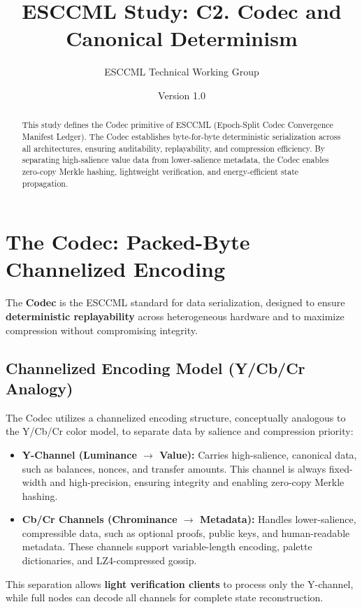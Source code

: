 \documentclass[11pt, a4paper]{article}
\title{\textbf{ESCCML Study: C2. Codec and Canonical Determinism}}
\author{ESCCML Technical Working Group}
\date{Version 1.0}
\begin{document}
\maketitle

\begin{abstract}
This study defines the Codec primitive of ESCCML (Epoch-Split Codec Convergence Manifest Ledger).
The Codec establishes byte-for-byte deterministic serialization across all architectures, ensuring
auditability, replayability, and compression efficiency. By separating high-salience value data from
lower-salience metadata, the Codec enables zero-copy Merkle hashing, lightweight verification, and
energy-efficient state propagation.
\end{abstract}

\section{The Codec: Packed-Byte Channelized Encoding}
The \textbf{Codec} is the ESCCML standard for data serialization, designed to ensure
\textbf{deterministic replayability} across heterogeneous hardware and to maximize compression
without compromising integrity.

\subsection{Channelized Encoding Model (Y/Cb/Cr Analogy)}
The Codec utilizes a channelized encoding structure, conceptually analogous to the Y/Cb/Cr color
model, to separate data by salience and compression priority:
\begin{itemize}
    \item \textbf{Y-Channel (Luminance $\rightarrow$ Value):} Carries high-salience, canonical data,
    such as balances, nonces, and transfer amounts. This channel is always fixed-width and
    high-precision, ensuring integrity and enabling zero-copy Merkle hashing.
    \item \textbf{Cb/Cr Channels (Chrominance $\rightarrow$ Metadata):} Handles lower-salience,
    compressible data, such as optional proofs, public keys, and human-readable metadata.
    These channels support variable-length encoding, palette dictionaries, and LZ4-compressed gossip.
\end{itemize}

This separation allows \textbf{light verification clients} to process only the Y-channel, while
full nodes can decode all channels for complete state reconstruction.
\end{document}
